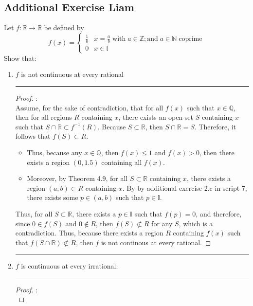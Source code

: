 \documentclass[openany, amssymb, psamsfonts]{amsart}
\newcommand{\bbI}{\mathbb{I}}
\newcommand{\bbN}{\mathbb{N}}
\newcommand{\bbQ}{\mathbb{Q}}
\newcommand{\bbR}{\mathbb{R}}
\newcommand{\bbZ}{\mathbb{Z}}
\newcommand{\arr}{\longrightarrow}
\theoremstyle{definition}
\numberwithin{equation}{section}
\begin{document}
\subsection*{Additional Exercise Liam}
Let $f\colon \bbR \arr \bbR$ be defined by 
\[     f(x) = \begin{cases} 
          \frac{1}{b} & x = \frac{a}{b} \; \text{with} \; a\in \bbZ; \text{and} \; a\in \bbN \; \text{coprime} \\
          0 & x\in \bbI 
       \end{cases}
    \] 
Show that: 
\begin{enumerate} [a]
    \item $f$ is not continuous at every rational
\vspace{4pt}     \hrule   \vspace{4pt} \begin{proof}:\\
    Assume, for the sake of contradiction, that for all $f(x)$ such that $x\in \bbQ$, then for all regions $R$ containing $x$, there exists an open set $S$ containing $x$ such that $S\cap \bbR \subset f^{-1}(R)$. Because $S\subset \bbR$, then $S\cap \bbR = S$. Therefore, it follows that $f(S) \subset R$. 
    \begin{itemize}
        \item Thus, because any $x\in \bbQ$, then $f(x)\leq 1$ and $f(x)>0$, then there exists a region $(0,1.5)$ containing all $f(x)$.
        \item Moreover, by Theorem 4.9, for all $S\subset \bbR$ containing $x$, there exists a region $(a,b) \subset R$ containing $x$. By by additional exercise 2.c in script 7, there exists some $p\in (a,b)$ such that $p\in \bbI$.
    \end{itemize}
    Thus, for all $S\subset \bbR$, there exists a $p\in \bbI$ such that $f(p) = 0$, and therefore, since $0\in f(S)$ and $0\notin R$, then $f(S) \not \subset R$ for any $S$, which is a contradiction. Thus, because there exists a region $R$ containing $f(x)$ such that $f(S\cap \bbR) \not \subset R$, then $f$ is not continous at every rational.
\end{proof}\vspace{4pt}     \hrule   \vspace{4pt}
\item $f$ is continuous at every irrational.
\vspace{4pt}     \hrule   \vspace{4pt} \begin{proof}:\\

\end{proof}
\end{enumerate}
\end{document}
